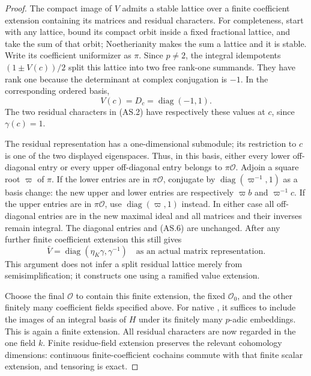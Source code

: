 \begin{proof}
The compact image of \(V\) admits a stable lattice over a finite
coefficient extension containing its matrices and residual characters.
For completeness, start with any lattice, bound its compact orbit
inside a fixed fractional lattice, and take the sum of that orbit;
Noetherianity makes the sum a lattice and it is stable.
Write its coefficient uniformizer as \(\pi\).
Since \(p\ne2\), the integral idempotents
\((1\pm V(c))/2\) split this lattice into two free rank-one
summands.  They have rank one because the determinant at complex
conjugation is \(-1\).  In the corresponding ordered basis,
\[
                        V(c)=D_c=\operatorname{diag}(-1,1).
 \tag{AS.6}
\]
The two residual characters in (AS.2) have respectively these
values at \(c\), since \(\gamma(c)=1\).

The residual representation has a one-dimensional submodule;
its restriction to \(c\) is one of the two displayed eigenspaces.
Thus, in this basis, either every lower off-diagonal entry or
every upper off-diagonal entry belongs to \(\pi\mathcal O\).
Adjoin a square root \(\varpi\) of \(\pi\).
If the lower entries are in \(\pi\mathcal O\), conjugate by
\(\operatorname{diag}(\varpi^{-1},1)\) as a basis change:
the new upper and lower entries are respectively
\(\varpi b\) and \(\varpi^{-1}c\).
If the upper entries are in \(\pi\mathcal O\), use
\(\operatorname{diag}(\varpi,1)\) instead.
In either case all off-diagonal entries are in the new maximal
ideal and all matrices and their inverses remain integral.
The diagonal entries and (AS.6) are unchanged.
After any further finite coefficient extension this still gives
\[
              \bar V=\operatorname{diag}(\eta_K\gamma,\gamma^{-1})
 \quad\text{as an actual matrix representation}.
 \tag{AS.7}
\]
This argument does not infer a split residual lattice merely from
semisimplification; it constructs one using a ramified value extension.

Choose the final \(\mathcal O\) to contain this finite extension,
the fixed \(\mathcal O_0\), and the other finitely many coefficient
fields specified above.  For native , it suffices to
include the images of an integral basis of \(H\) under its finitely
many \(p\)-adic embeddings.  This is again a finite extension.
All residual characters are now regarded in the one field \(k\).
Finite residue-field extension preserves the relevant cohomology
dimensions: continuous finite-coefficient cochains commute with
that finite scalar extension, and tensoring is exact.


\end{proof}
